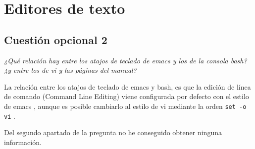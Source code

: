 \section{Editores de texto}
\subsection{Cuestión opcional 2}
\textit{¿Qué relación hay entre los atajos de teclado de emacs y los de la consola bash? ¿y entre los de vi y las páginas del manual?}\newline
 
 La relación entre los atajos de teclado de emacs y bash, es que la edición de línea de comando (Command Line Editing) viene configurada por defecto con el estilo de emacs \cite{bash1}, aunque es posible cambiarlo al estilo de vi mediante la orden \texttt{set -o vi} \cite{bash2}. 
 
Del segundo apartado de la pregunta no he conseguido obtener ninguna información.
 
 




\newpage

 


